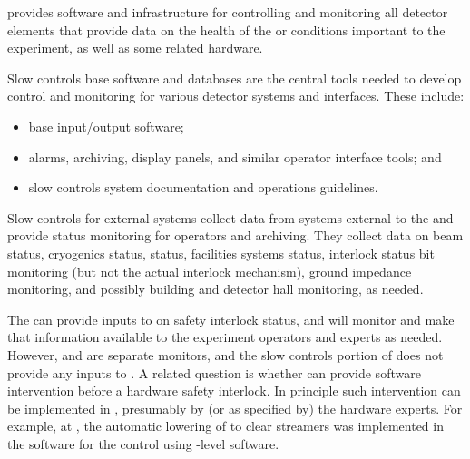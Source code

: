  provides software and infrastructure for controlling and monitoring all detector elements that provide data on the health of the  or conditions important to the experiment, as well as  some related hardware. 

Slow controls base software and databases are the central tools needed to develop
control and monitoring for various detector systems and interfaces. These include:
\begin{itemize}
\item base input/output software;
\item alarms, archiving, display panels, and similar operator interface tools; and 
\item slow controls system documentation and operations guidelines.
\end{itemize}

Slow controls for external systems collect data from systems
external to the  and provide status monitoring for operators
and archiving. %
They %
collect data on beam status, cryogenics status,
 status, facilities systems status, interlock
status bit monitoring (but not the actual interlock mechanism), ground
impedance monitoring, and possibly building and detector hall
monitoring, as needed.

The  can provide inputs to  on safety interlock status, and  will monitor and make that information available to the experiment operators and experts as needed. However,  and  are separate monitors, and the slow controls portion of  does not provide any inputs to . A related question is whether  can provide software intervention before a hardware safety interlock. In principle such intervention can be implemented in , presumably by (or as specified by) the hardware experts. For example, at , the automatic lowering of  to clear streamers was implemented in the software for the  control using -level software. 



